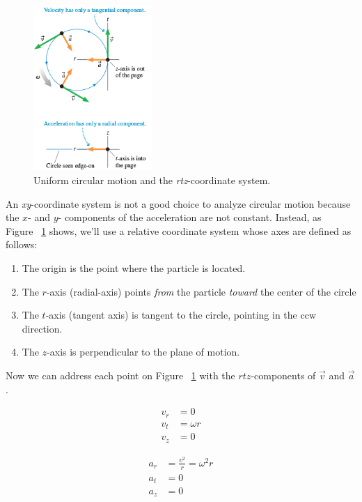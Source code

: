 \begin{figure}
    \centering
    \includegraphics[width=0.4\textwidth]{../figures/rtz-coordinates.png}
    \caption{Uniform circular motion and the \emph{rtz}-coordinate
    system.}%
    \label{fig:rtz-coordinates}
\end{figure}

An \emph{xy}-coordinate system is not a good choice to analyze circular
motion because the
$
    x
$- and
$
    y
$- components of the acceleration are not constant.  Instead, as Figure~%
\ref{fig:rtz-coordinates} shows, we'll use a relative coordinate system
whose axes are defined as follows:
\begin{enumerate}
    \item
        The origin is the point where the particle is located.
    \item
        The
        $
            r
        $-axis (radial-axis) points \emph{from} the particle \emph{toward}
        the center of the circle
    \item
        The
        $
            t
        $-axis (tangent axis) is tangent to the circle, pointing in the
        ccw direction.
    \item
        The
        $
            z
        $-axis is perpendicular to the plane of motion.
\end{enumerate}

Now we can address each point on Figure~%
\ref{fig:rtz-coordinates} with the
$
    rtz
$-components of
$
    \vec{v}
$ and
$
    \vec{a}
$%
.
\noindent
\begin{minipage}{.5\linewidth}
    \begin{align*}
        v_r &= 0 \\
        v_t &= \omega r \\
        v_z &= 0
    \end{align*}
\end{minipage}
\begin{minipage}{.5\linewidth}
    \begin{align*}
        a_r &= \frac{v^2}{r} = \omega^2r \\
        a_t &= 0 \\
        a_z &= 0
    \end{align*}
\end{minipage}

